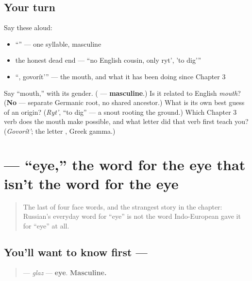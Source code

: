 \subsection*{Your turn}
Say these aloud:

\begin{itemize}
\raggedright
  \item \textquotedblleft{}\textquotedblright{} — one syllable, masculine
  \item the honest dead end — \textquotedblleft{}no English cousin, only ryt', 'to dig'\textquotedblright{}
  \item \textquotedblleft{}, govorít'\textquotedblright{} — the mouth, and what it has been doing since Chapter 3
\end{itemize}

\begin{tcolorbox}[breakable,colback=teal!4,colframe=teal!35!black,title={Before you move on}]
Say \textquotedblleft{}mouth,\textquotedblright{} with its gender. (\textbf{} — \textbf{masculine}.) Is it related to English \emph{mouth}? (\textbf{No} — separate Germanic root, no shared ancestor.) What is its own best guess of an origin? (\emph{Ryt'}, \textquotedblleft{}to dig\textquotedblright{} — a snout rooting the ground.) Which Chapter 3 verb does the mouth make possible, and what letter did that verb first teach you? (\emph{Govorít'}; the letter \textbf{}, Greek gamma.)
\end{tcolorbox}
\section[\texorpdfstring{\ru{глаз} (glaz)}{глаз (glaz)}]{ — \textquotedblleft{}eye,\textquotedblright{} the word for the eye that isn't the word for the eye}

\label{lesson:RU-C09-glaz}



\begin{quote}
The last of four face words, and the strangest story in the chapter: Russian's everyday word for \textquotedblleft{}eye\textquotedblright{} is not the word Indo-European gave it for \textquotedblleft{}eye\textquotedblright{} at all.
\end{quote}

\subsection*{You'll want to know first — }
\begin{quote}
\textbf{} — \emph{glaz} — \textbf{eye}. \textbf{Masculine.}
\end{quote}

